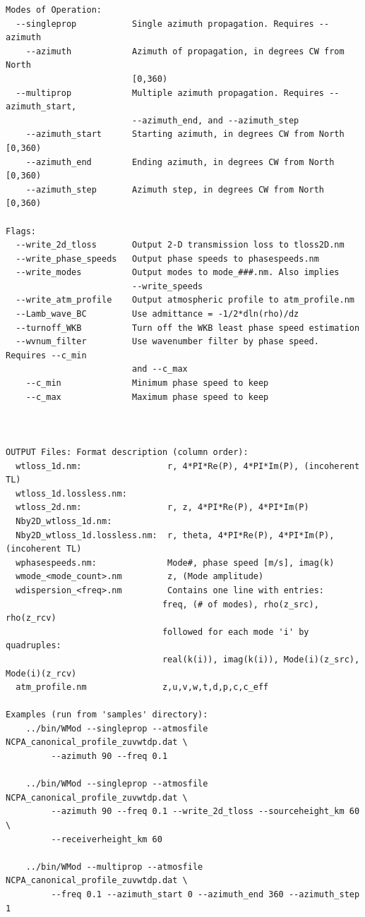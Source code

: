 \begin{verbatim}
Modes of Operation:
  --singleprop           Single azimuth propagation. Requires --azimuth
    --azimuth            Azimuth of propagation, in degrees CW from North
                         [0,360)
  --multiprop            Multiple azimuth propagation. Requires --azimuth_start,
                         --azimuth_end, and --azimuth_step
    --azimuth_start      Starting azimuth, in degrees CW from North [0,360)
    --azimuth_end        Ending azimuth, in degrees CW from North [0,360)
    --azimuth_step       Azimuth step, in degrees CW from North [0,360)

Flags:
  --write_2d_tloss       Output 2-D transmission loss to tloss2D.nm
  --write_phase_speeds   Output phase speeds to phasespeeds.nm
  --write_modes          Output modes to mode_###.nm. Also implies
                         --write_speeds
  --write_atm_profile    Output atmospheric profile to atm_profile.nm
  --Lamb_wave_BC         Use admittance = -1/2*dln(rho)/dz
  --turnoff_WKB          Turn off the WKB least phase speed estimation
  --wvnum_filter         Use wavenumber filter by phase speed. Requires --c_min
                         and --c_max
    --c_min              Minimum phase speed to keep
    --c_max              Maximum phase speed to keep



OUTPUT Files: Format description (column order):
  wtloss_1d.nm:                 r, 4*PI*Re(P), 4*PI*Im(P), (incoherent TL)
  wtloss_1d.lossless.nm:
  wtloss_2d.nm:                 r, z, 4*PI*Re(P), 4*PI*Im(P)
  Nby2D_wtloss_1d.nm:
  Nby2D_wtloss_1d.lossless.nm:  r, theta, 4*PI*Re(P), 4*PI*Im(P), (incoherent TL)
  wphasespeeds.nm:              Mode#, phase speed [m/s], imag(k)
  wmode_<mode_count>.nm         z, (Mode amplitude)
  wdispersion_<freq>.nm         Contains one line with entries:
                               freq, (# of modes), rho(z_src), rho(z_rcv)
                               followed for each mode 'i' by quadruples:
                               real(k(i)), imag(k(i)), Mode(i)(z_src), Mode(i)(z_rcv)
  atm_profile.nm               z,u,v,w,t,d,p,c,c_eff

Examples (run from 'samples' directory):
    ../bin/WMod --singleprop --atmosfile NCPA_canonical_profile_zuvwtdp.dat \
         --azimuth 90 --freq 0.1

    ../bin/WMod --singleprop --atmosfile NCPA_canonical_profile_zuvwtdp.dat \
         --azimuth 90 --freq 0.1 --write_2d_tloss --sourceheight_km 60 \
         --receiverheight_km 60

    ../bin/WMod --multiprop --atmosfile NCPA_canonical_profile_zuvwtdp.dat \
         --freq 0.1 --azimuth_start 0 --azimuth_end 360 --azimuth_step 1

\end{verbatim}


